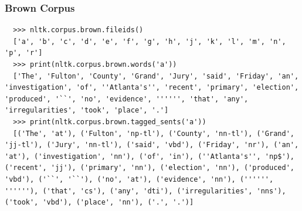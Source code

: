 \begin{frame}[fragile]\frametitle{Brown Corpus}
\scriptsize

\begin{lstlisting}
  >>> nltk.corpus.brown.fileids()
  ['a', 'b', 'c', 'd', 'e', 'f', 'g', 'h', 'j', 'k', 'l', 'm', 'n', 'p', 'r']
  >>> print(nltk.corpus.brown.words('a'))
  ['The', 'Fulton', 'County', 'Grand', 'Jury', 'said', 'Friday', 'an', 'investigation', 'of', ''Atlanta's'', 'recent', 'primary', 'election', 'produced', '``', 'no', 'evidence', '''''', 'that', 'any', 'irregularities', 'took', 'place', '.']
  >>> print(nltk.corpus.brown.tagged_sents('a'))
  [('The', 'at'), ('Fulton', 'np-tl'), ('County', 'nn-tl'), ('Grand', 'jj-tl'), ('Jury', 'nn-tl'), ('said', 'vbd'), ('Friday', 'nr'), ('an', 'at'), ('investigation', 'nn'), ('of', 'in'), (''Atlanta's'', 'np$'), ('recent', 'jj'), ('primary', 'nn'), ('election', 'nn'), ('produced', 'vbd'), ('``', '``'), ('no', 'at'), ('evidence', 'nn'), ('''''', ''''''), ('that', 'cs'), ('any', 'dti'), ('irregularities', 'nns'), ('took', 'vbd'), ('place', 'nn'), ('.', '.')]
\end{lstlisting}
\end{frame}










